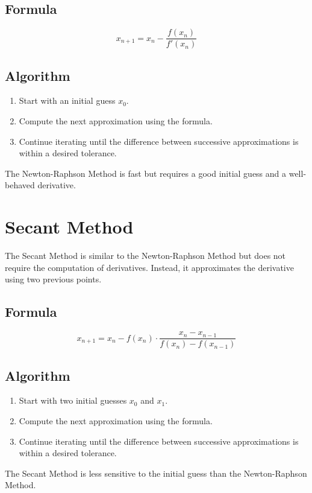 \documentclass[12pt]{article}
\begin{document}
\subsection*{Formula}
\[
x_{n+1} = x_n - \frac{f(x_n)}{f'(x_n)}
\]

\subsection*{Algorithm}
\begin{enumerate}
    \item Start with an initial guess \( x_0 \).
    \item Compute the next approximation using the formula.
    \item Continue iterating until the difference between successive approximations is within a desired tolerance.
\end{enumerate}

The Newton-Raphson Method is fast but requires a good initial guess and a well-behaved derivative.

\section*{Secant Method}

The Secant Method is similar to the Newton-Raphson Method but does not require the computation of derivatives. Instead, it approximates the derivative using two previous points.

\subsection*{Formula}
\[
x_{n+1} = x_n - f(x_n) \cdot \frac{x_n - x_{n-1}}{f(x_n) - f(x_{n-1})}
\]

\subsection*{Algorithm}
\begin{enumerate}
    \item Start with two initial guesses \( x_0 \) and \( x_1 \).
    \item Compute the next approximation using the formula.
    \item Continue iterating until the difference between successive approximations is within a desired tolerance.
\end{enumerate}

The Secant Method is less sensitive to the initial guess than the Newton-Raphson Method.
\end{document}
